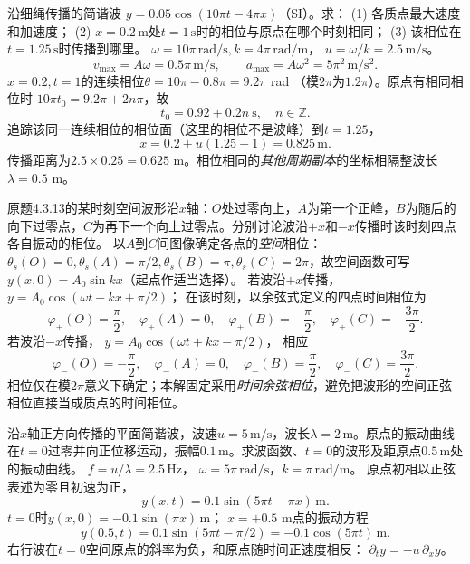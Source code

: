 \problemtext 沿细绳传播的简谐波
$y=0.05\cos(10\pi t-4\pi x)$（SI）。求：
(1) 各质点最大速度和加速度；
(2) $x=0.2\,\mathrm m$处$t=1\,\mathrm s$时的相位与原点在哪个时刻相同；
(3) 该相位在$t=1.25\,\mathrm s$时传播到哪里。
\workings
$\omega=10\pi\,\mathrm{rad/s},k=4\pi\,\mathrm{rad/m}$，
$u=\omega/k=2.5\,\mathrm{m/s}$。
\[
\boxed{v_{\max}=A\omega=0.5\pi\,\mathrm{m/s}},\qquad
\boxed{a_{\max}=A\omega^2=5\pi^2\,\mathrm{m/s^2}}.
\]
$x=0.2,t=1$的连续相位$\theta=10\pi-0.8\pi=9.2\pi$ rad
（模$2\pi$为$1.2\pi$）。原点有相同相位时
$10\pi t_0=9.2\pi+2n\pi$，故
\[
\boxed{t_0=0.92+0.2n\ \mathrm s,\quad n\in\mathbb Z}.
\]
追踪该同一连续相位的相位面（这里的相位不是波峰）到$t=1.25$，
\[
\boxed{x=0.2+u(1.25-1)=0.825\,\mathrm m}.
\]
\crosscheck 传播距离为$2.5\times0.25=0.625$ m。相位相同的\emph{其他周期副本}的坐标相隔整波长$\lambda=0.5$ m。

\problemtext 原题4.3.13的某时刻空间波形沿$x$轴：$O$处过零向上，$A$为第一个正峰，$B$为随后的向下过零点，$C$为再下一个向上过零点。分别讨论波沿$+x$和$-x$传播时该时刻四点各自振动的相位。
\workings
以$A$到$C$间图像确定各点的\emph{空间}相位：
$\theta_s(O)=0,\theta_s(A)=\pi/2,\theta_s(B)=\pi,\theta_s(C)=2\pi$，故空间函数可写$y(x,0)=A_0\sin kx$（起点作适当选择）。
若波沿$+x$传播，
$y=A_0\cos(\omega t-kx+\pi/2)$；
在该时刻，以余弦式定义的四点时间相位为
\[
\boxed{\varphi_+(O)=\frac\pi2,\quad
\varphi_+(A)=0,\quad
\varphi_+(B)=-\frac\pi2,\quad
\varphi_+(C)=-\frac{3\pi}{2}}.
\]
若波沿$-x$传播，
$y=A_0\cos(\omega t+kx-\pi/2)$，
相应
\[
\boxed{\varphi_-(O)=-\frac\pi2,\quad
\varphi_-(A)=0,\quad
\varphi_-(B)=\frac\pi2,\quad
\varphi_-(C)=\frac{3\pi}{2}}.
\]
\crosscheck 相位仅在模$2\pi$意义下确定；本解固定采用\emph{时间余弦相位}，避免把波形的空间正弦相位直接当成质点的时间相位。

\problemtext 沿$x$轴正方向传播的平面简谐波，波速$u=5\,\mathrm{m/s}$，波长$\lambda=2\,\mathrm m$。原点的振动曲线在$t=0$过零并向正位移运动，振幅$0.1\,\mathrm m$。求波函数、$t=0$的波形及距原点$0.5\,\mathrm m$处的振动曲线。
\workings
$f=u/\lambda=2.5\,\mathrm{Hz}$，
$\omega=5\pi\,\mathrm{rad/s}$，$k=\pi\,\mathrm{rad/m}$。
原点初相以正弦表述为零且初速为正，
\[
\boxed{y(x,t)=0.1\sin(5\pi t-\pi x)\,\mathrm m}.
\]
$t=0$时$\boxed{y(x,0)=-0.1\sin(\pi x)\,\mathrm m}$；
$x=+0.5$ m点的振动方程
\[
\boxed{y(0.5,t)=0.1\sin(5\pi t-\pi/2)
=-0.1\cos(5\pi t)\,\mathrm m}.
\]
\crosscheck 右行波在$t=0$空间原点的斜率为负，和原点随时间正速度相反：
$\partial_ty=-u\,\partial_xy$。

